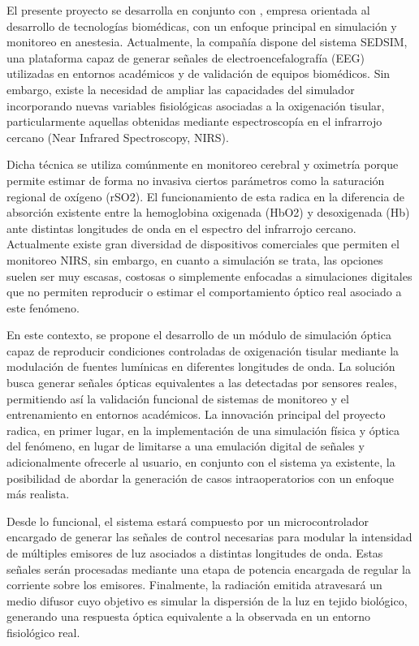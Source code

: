 \documentclass[
11pt, %
]{charter}
\begin{document}
El presente proyecto se desarrolla en conjunto con \empclientename, empresa orientada al desarrollo de tecnologías biomédicas, con un enfoque principal en simulación y monitoreo en anestesia. Actualmente, la compañía dispone del sistema SEDSIM, una plataforma capaz de generar señales de electroencefalografía (EEG) utilizadas en entornos académicos y de validación de equipos biomédicos. Sin embargo, existe la necesidad de ampliar las capacidades del simulador incorporando nuevas variables fisiológicas asociadas a la oxigenación tisular, particularmente aquellas obtenidas mediante espectroscopía en el infrarrojo cercano (Near Infrared Spectroscopy, NIRS).

Dicha técnica se utiliza comúnmente en monitoreo cerebral y oximetría porque permite estimar de forma no invasiva ciertos parámetros como la saturación regional de oxígeno (rSO2). El funcionamiento de esta  radica en la diferencia de absorción existente entre la hemoglobina oxigenada (HbO2) y desoxigenada (Hb) ante distintas longitudes de onda en el espectro del infrarrojo cercano. Actualmente existe gran diversidad de dispositivos comerciales que permiten el monitoreo NIRS, sin embargo, en cuanto a simulación se trata, las opciones suelen ser muy escasas, costosas o simplemente enfocadas a simulaciones digitales que no permiten reproducir o estimar el comportamiento óptico real asociado a este fenómeno.

En este contexto, se propone el desarrollo de un módulo de simulación óptica capaz de reproducir condiciones controladas de oxigenación tisular mediante la modulación de fuentes lumínicas en diferentes longitudes de onda. La solución busca generar señales ópticas equivalentes a las detectadas por sensores reales, permitiendo así la validación funcional de sistemas de monitoreo y el entrenamiento en entornos académicos. La innovación principal del proyecto radica, en primer lugar, en la implementación de una simulación física y óptica del fenómeno, en lugar de limitarse a una emulación digital de señales y adicionalmente ofrecerle al usuario, en conjunto con el sistema ya existente, la posibilidad de abordar la generación de casos intraoperatorios con un enfoque más realista.

Desde lo funcional, el sistema estará compuesto por un microcontrolador encargado de generar las señales de control necesarias para modular la intensidad de múltiples emisores de luz asociados a distintas longitudes de onda. Estas señales serán procesadas mediante una etapa de potencia encargada de regular la corriente sobre los emisores. Finalmente, la radiación emitida atravesará un medio difusor cuyo objetivo es simular la dispersión de la luz en tejido biológico, generando una respuesta óptica equivalente a la observada en un entorno fisiológico real.
\end{document}
